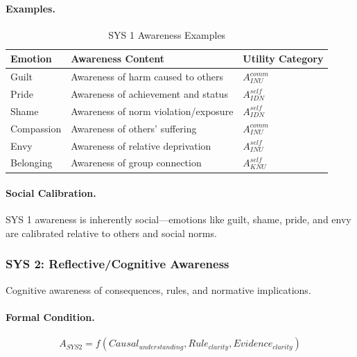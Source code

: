 \paragraph{Examples.}
\begin{table}[htbp]
\centering
\caption{SYS 1 Awareness Examples}
\label{tab:sys1-examples}
\renewcommand{\arraystretch}{1.3}
\begin{tabular}{@{}lll@{}}
\toprule
\textbf{Emotion} & \textbf{Awareness Content} & \textbf{Utility Category} \\
\midrule
Guilt & Awareness of harm caused to others & $A^{comm}_{INU}$ \\
Pride & Awareness of achievement and status & $A^{self}_{IDN}$ \\
Shame & Awareness of norm violation/exposure & $A^{self}_{IDN}$ \\
Compassion & Awareness of others' suffering & $A^{comm}_{INU}$ \\
Envy & Awareness of relative deprivation & $A^{self}_{INU}$ \\
Belonging & Awareness of group connection & $A^{self}_{KNU}$ \\
\bottomrule
\end{tabular}
\end{table}

\paragraph{Social Calibration.}
SYS 1 awareness is inherently social---emotions like guilt, shame, pride,
and envy are calibrated relative to others and social norms.

\subsubsection{SYS 2: Reflective/Cognitive Awareness}

\begin{definition}
\label{def:sys2}
Cognitive awareness of consequences, rules, and normative implications.
\end{definition}

\paragraph{Formal Condition.}
\begin{equation}
A_{SYS2} = f(Causal_{understanding}, Rule_{clarity}, Evidence_{clarity})
\end{equation}

